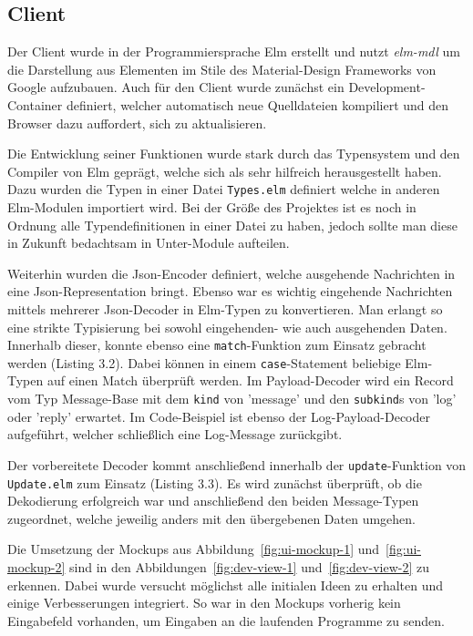 \subsection{Client}
Der Client wurde in der Programmiersprache Elm erstellt und nutzt \textit{elm-mdl} um die Darstellung aus Elementen im Stile des Material-Design Frameworks von Google aufzubauen.
Auch für den Client wurde zunächst ein Development-Container definiert, welcher automatisch neue Quelldateien kompiliert und den Browser dazu auffordert, sich zu aktualisieren.
\par
Die Entwicklung seiner Funktionen wurde stark durch das Typensystem und den Compiler von Elm geprägt, welche sich als sehr hilfreich herausgestellt haben.
Dazu wurden die Typen in einer Datei \texttt{Types.elm} definiert welche in anderen Elm-Modulen importiert wird.
Bei der Größe des Projektes ist es noch in Ordnung alle Typendefinitionen in einer Datei zu haben, jedoch sollte man diese in Zukunft bedachtsam in Unter-Module aufteilen.
\par
Weiterhin wurden die Json-Encoder definiert, welche ausgehende Nachrichten in eine Json-Representation bringt.
Ebenso war es wichtig eingehende Nachrichten mittels mehrerer Json-Decoder in Elm-Typen zu konvertieren.
Man erlangt so eine strikte Typisierung bei sowohl eingehenden- wie auch  ausgehenden Daten.
Innerhalb dieser, konnte ebenso eine \texttt{match}-Funktion zum Einsatz gebracht werden (Listing 3.2).
Dabei können in einem \texttt{case}-Statement beliebige Elm-Typen auf einen Match überprüft werden.
Im Payload-Decoder wird ein Record vom Typ Message-Base mit dem \texttt{kind} von 'message' und den \texttt{subkind}s von 'log' oder 'reply' erwartet.
Im Code-Beispiel ist ebenso der Log-Payload-Decoder aufgeführt, welcher schließlich eine Log-Message zurückgibt.
\par Der vorbereitete Decoder kommt anschließend innerhalb der \texttt{update}-Funktion von \texttt{Update.elm} zum Einsatz (Listing 3.3).
Es wird zunächst überprüft, ob die Dekodierung erfolgreich war und anschließend den beiden Message-Typen zugeordnet, welche jeweilig anders mit den übergebenen Daten umgehen.
\par Die Umsetzung der Mockups aus Abbildung~\ref{fig:ui-mockup-1} und~\ref{fig:ui-mockup-2} sind in den Abbildungen~\ref{fig:dev-view-1} und~\ref{fig:dev-view-2} zu erkennen.
Dabei wurde versucht möglichst alle initialen Ideen zu erhalten und einige Verbesserungen integriert.
So war in den Mockups vorherig kein Eingabefeld vorhanden, um Eingaben an die laufenden Programme zu senden.
